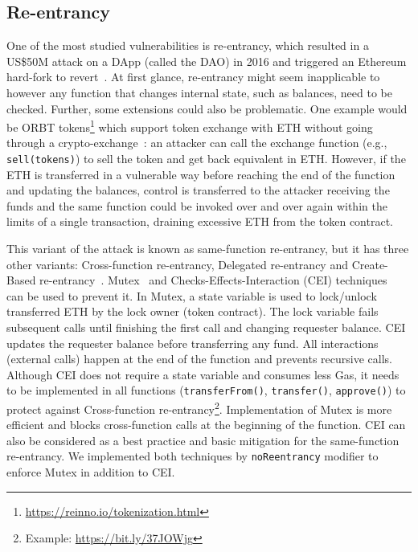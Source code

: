 \subsection{Re-entrancy}
One of the most studied vulnerabilities is re-entrancy, which resulted in a US\$50M attack on a DApp (called the DAO) in 2016 and triggered an Ethereum hard-fork to revert~\cite{DAO1}. At first glance, re-entrancy might seem inapplicable to \erc however any function that changes internal state, such as balances, need to be checked. Further, some \erc extensions could also be problematic. {\blue One example would be ORBT tokens\footnote{\url{https://reinno.io/tokenization.html}} which support token exchange with ETH without going through a crypto-exchange~\cite{ORBT}}: an attacker can call the exchange function (e.g., \texttt{sell(tokens)}) to sell the token and get back equivalent in ETH. However, if the ETH is transferred in a vulnerable way before reaching the end of the function and updating the balances, control is transferred to the attacker receiving the funds and the same function could be invoked over and over again within the limits of a single transaction, draining excessive ETH from the token contract.


This variant of the attack is known as same-function re-entrancy, but it has three other variants: Cross-function re-entrancy, Delegated re-entrancy and Create-Based re-entrancy~\cite{SEREUM}. Mutex~\cite{WiKiMutex} and Checks-Effects-Interaction (CEI) techniques~\cite{SolidtyDocSec} can be used to prevent it. In Mutex, a state variable is used to lock/unlock transferred ETH by the lock owner (\ie token contract). The lock variable fails subsequent calls until finishing the first call and changing requester balance. CEI updates the requester balance before transferring any fund. All interactions (\ie external calls) happen at the end of the function and prevents recursive calls. Although CEI does not require a state variable and consumes less Gas, it needs to be implemented in all functions (\eg \texttt{transferFrom()}, \texttt{transfer()}, \texttt{approve()}) to protect against Cross-function re-entrancy\footnote{Example: \url{https://bit.ly/37JOWjg}}. { \blue Implementation of Mutex is more efficient and blocks cross-function calls at the beginning of the function. CEI can also be considered as a best practice and basic mitigation for the same-function re-entrancy.} We implemented both techniques by \texttt{noReentrancy} modifier to enforce Mutex in addition to CEI.

